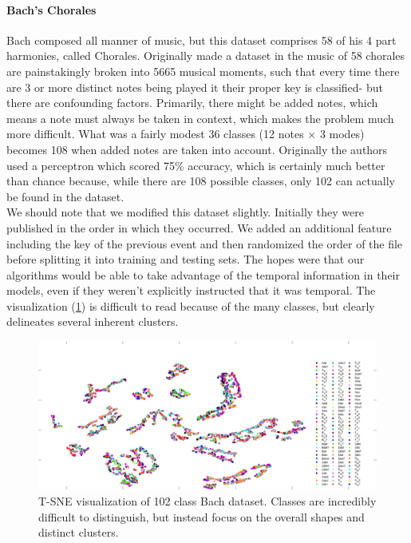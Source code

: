 \paragraph{Bach's Chorales}
Bach composed all manner of music, but this dataset comprises 58 of his 4 part harmonies, called Chorales.  Originally made a dataset in \cite{radicioni_breve:_2010} the music of 58 chorales are painstakingly broken into 5665 musical moments, such that every time there are 3 or more distinct notes being played it their proper key is classified- but there are confounding factors. Primarily, there might be added notes, which means a note must always be taken in context, which makes the problem much more difficult.  What was a fairly modest 36 classes (12 notes $\times$ 3 modes) becomes 108 when added notes are taken into account.  Originally the authors used a perceptron which scored 75\% accuracy, which is certainly much better than chance because, while there are 108 possible classes, only 102 can actually be found in the dataset.  \\We should note that we modified this dataset slightly.  Initially they were published in the order in which they occurred.  We added an additional feature including the key of the previous event and then randomized the order of the file before splitting it into training and testing sets.  The hopes were that our algorithms would be able to take advantage of the temporal information in their models, even if they weren't explicitly instructed that it was temporal.  The visualization (\ref{fig:bachtsne}) is difficult to read because of the many classes, but clearly delineates several inherent clusters.
\begin{figure}
	\centering
	\includegraphics[width=0.9\linewidth]{figures/png/BachTSNE}
	\caption[T-SNE visualization of Bach dataset]{T-SNE visualization of 102 class Bach dataset.  Classes are incredibly difficult to distinguish, but instead focus on the overall shapes and distinct clusters.}
	\label{fig:bachtsne}
\end{figure}
